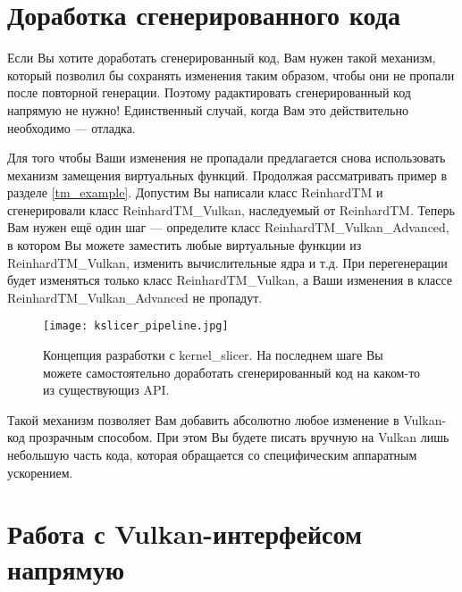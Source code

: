 \documentclass[11pt,fleqn,english,russian]{report} %
\begin{document}
\chapter{Доработка сгенерированного кода}\label{work_with_generated_code}

Если Вы хотите доработать сгенерированный код, Вам нужен такой механизм, который позволил бы сохранять изменения таким образом, чтобы они не пропали после повторной генерации. Поэтому радактировать сгенерированный код напрямую не нужно! Единственный случай, когда Вам это действительно необходимо --- отладка.

Для того чтобы Ваши изменения не пропадали предлагается снова использовать механизм замещения виртуальных функций. Продолжая рассматривать пример в разделе \ref{tm_example}. Допустим Вы написали класс ReinhardTM и сгенерировали класс ReinhardTM\_Vulkan, наследуемый от ReinhardTM. Теперь Вам нужен ещё один шаг --- определите класс ReinhardTM\_Vulkan\_Advanced, в котором Вы можете заместить любые виртуальные функции из ReinhardTM\_Vulkan, изменить вычислительные ядра и т.д. При перегенерации будет изменяться только класс ReinhardTM\_Vulkan, а Ваши изменения в классе ReinhardTM\_Vulkan\_Advanced не пропадут.

\begin{figure}[h!]
\centering
\texttt{[image: kslicer\_pipeline.jpg]}
\caption{Концепция разработки с kernel\_slicer. На последнем шаге Вы можете самостоятельно доработать сгенерированный код на каком-то из существующиз API.}
\end{figure}

Такой механизм позволяет Вам добавить абсолютно любое изменение в Vulkan-код прозрачным способом. При этом Вы будете писать вручную на Vulkan лишь небольшую часть кода, которая обращается со специфическим аппаратным ускорением.



\chapter{Работа с Vulkan-интерфейсом напрямую}\label{vulkan-direct}
\end{document}
